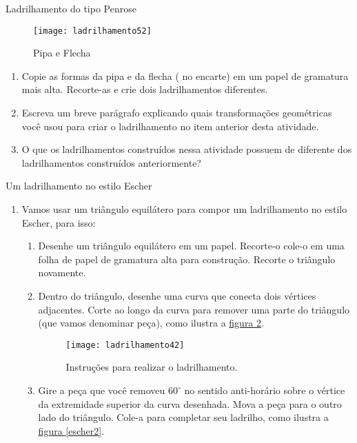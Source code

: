 {\begin{task}{Ladrilhamento do tipo Penrose}
	\begin{figure}[H]
	\centering
	\texttt{[image: ladrilhamento52]}
	\caption{Pipa e Flecha}
	\label{pen2}
	\end{figure}
	
	\begin{enumerate}
			\item Copie as formas da pipa e da flecha ( no encarte) em um papel de gramatura mais alta. Recorte-as e crie dois ladrilhamentos diferentes.
		\item Escreva um breve parágrafo explicando quais transformações geométricas você usou para criar o ladrilhamento no item anterior desta atividade. 
		\item O que os ladrilhamentos construídos nessa atividade possuem de diferente dos ladrilhamentos construídos anteriormente?
	\end{enumerate}
	
\end{task}


\begin{task}{Um ladrilhamento no estilo Escher}\label{at_outros3}
\begin{enumerate}
\item Vamos usar um triângulo equilátero para compor um ladrilhamento no estilo Escher, para isso:  
\begin{enumerate}

	\item Desenhe um triângulo equilátero em um papel. Recorte-o  cole-o em uma folha de papel de gramatura alta para construção. Recorte o triângulo novamente.

	\item Dentro do triângulo, desenhe uma curva que conecta dois vértices adjacentes. Corte ao longo da curva para remover uma parte do triângulo (que vamos denominar peça), como ilustra a \hyperref[escher1]{figura \ref{escher1}}.

	\begin{figure}[H]
	\centering
	\texttt{[image: ladrilhamento42]}
	\caption{Instruções para realizar o ladrilhamento.}
	\label{escher1}
	\end{figure}

	\item Gire a peça que você removeu $60^{\circ}$ no sentido anti-horário sobre o vértice da extremidade superior da curva desenhada. Mova a peça para o outro lado do triângulo. Cole-a para completar seu ladrilho, como ilustra a \hyperref[escher2]{figura \ref{escher2}}.


\end{enumerate}
\end{enumerate}
\end{task}}

